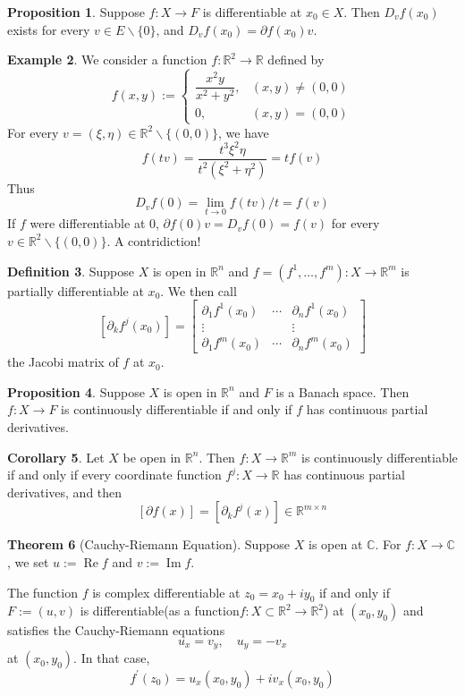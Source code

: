 \documentclass[12pt,a4paper]{book}
\newcommand{\bb}[1]{\mathbb{#1}}
\theoremstyle{definition}
\newtheorem{defn}{Definition}[section]
\newtheorem{coro}[defn]{Corollary}
\newtheorem{theo}[defn]{Theorem}
\newtheorem{prop}[defn]{Proposition}
\newtheorem{exam}[defn]{Example}
\begin{document}
\begin{prop}
    Suppose $f: X \rightarrow F$ is differentiable at $x_0 \in X$. Then $D_v f\left(x_0\right)$ exists for every $v \in E \backslash\{0\}$, and $D_v f\left(x_0\right)=\partial f\left(x_0\right) v$.
\end{prop}
\begin{exam}
    We consider a function $f: \mathbb{R}^2 \rightarrow \mathbb{R}$ defined by
    $$
    f(x, y):=\left\{\begin{array}{cl}
    \dfrac{x^2 y}{x^2+y^2}, & (x, y) \neq(0,0) \\
    0, & (x, y)=(0,0)
    \end{array}\right.
    $$
    For every $v=(\xi, \eta) \in \mathbb{R}^2 \backslash\{(0,0)\}$, we have
    $$
    f(t v)=\frac{t^3 \xi^2 \eta}{t^2\left(\xi^2+\eta^2\right)}=t f(v)
    $$
    Thus
    $$
    D_v f(0)=\lim _{t \rightarrow 0} f(t v) / t=f(v)
    $$
    If $f$ were differentiable at 0, $\partial f(0) v=D_v f(0)=f(v)$ for every $v \in \mathbb{R}^2 \backslash\{(0,0)\}$. A contridiction! 
\end{exam}
\begin{defn}
    Suppose $X$ is open in $\mathbb{R}^n$ and $f=\left(f^1, \ldots, f^m\right): X \rightarrow \mathbb{R}^m$ is partially differentiable at $x_0$. We then call
    $$
    \left[\partial_k f^j\left(x_0\right)\right]=\left[\begin{array}{ccc}
    \partial_1 f^1\left(x_0\right) & \cdots & \partial_n f^1\left(x_0\right) \\
    \vdots & & \vdots \\
    \partial_1 f^m\left(x_0\right) & \cdots & \partial_n f^m\left(x_0\right)
    \end{array}\right]
    $$
    the Jacobi matrix of $f$ at $x_0$.
\end{defn}
\begin{prop}
    Suppose $X$ is open in $\mathbb{R}^n$ and $F$ is a Banach space. Then $f: X \rightarrow F$ is continuously differentiable if and only if $f$ has continuous partial derivatives.
\end{prop}
\begin{coro}
    Let $X$ be open in $\mathbb{R}^n$. Then $f: X \rightarrow \mathbb{R}^m$ is continuously differentiable if and only if every coordinate function $f^j: X \rightarrow \mathbb{R}$ has continuous partial derivatives, and then
    $$
    [\partial f(x)]=\left[\partial_k f^j(x)\right] \in \mathbb{R}^{m \times n}
    $$
\end{coro}
\begin{theo}[Cauchy-Riemann Equation]
    Suppose $X$ is open at $\mathbb{C}$. For $f: X \rightarrow \mathbb{C}$, we set $u:=\operatorname{Re} f$ and $v:=\operatorname{Im} f$.

    The function $f$ is complex differentiable at $z_0=x_0+i y_0$ if and only if $F:=(u, v)$ is 
    differentiable(as a function$f:X\subset \bb{R}^2\rightarrow \bb{R}^2$) at $\left(x_0, y_0\right)$ and satisfies the Cauchy-Riemann equations 
    $$
    u_x=v_y, \quad u_y=-v_x
    $$
    at $\left(x_0, y_0\right)$. In that case,
    $$
    f^{\prime}\left(z_0\right)=u_x\left(x_0, y_0\right)+i v_x\left(x_0, y_0\right)
    $$
    
\end{theo}
\end{document}
